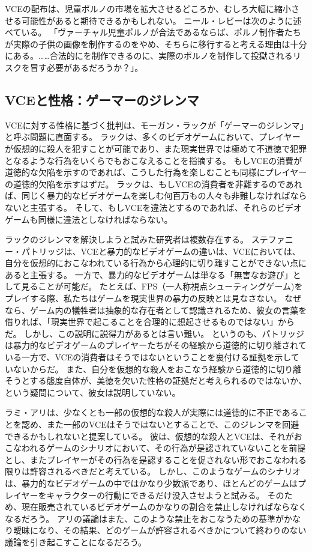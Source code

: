 \documentclass[paper=a4,book,openany]{jlreq}
\newcommand{\ig}[1]{}           %
\begin{document}
VCEの配布は、児童ポルノの市場を拡大させるどころか、むしろ大幅に縮小させる可能性があると期待できるかもしれない。
ニール・レビーは次のように述べている。
「ヴァーチャル児童ポルノが合法であるならば、ポルノ制作者たちが実際の子供の画像を制作するのをやめ、そちらに移行すると考える理由は十分にある。……合法的にを制作できるのに、実際のポルノを制作して投獄されるリスクを冒す必要があるだろうか？」\citep[p.320]{levy02:_virtual_child_pornog}\ig{Neil Levy}。

\subsection{VCEと性格：ゲーマーのジレンマ}

VCEに対する性格に基づく批判は、モーガン・ラックが「ゲーマーのジレンマ」と呼ぶ問題に直面する。
ラックは、多くのビデオゲームにおいて、プレイヤーが仮想的に殺人を犯すことが可能であり、また現実世界では極めて不道徳で犯罪となるような行為をいくらでもおこなえることを指摘する。
もしVCEの消費が道徳的な欠陥を示すのであれば、こうした行為を楽しむことも同様にプレイヤーの道徳的欠陥を示すはずだ。
ラックは、もしVCEの消費者を非難するのであれば、同じく暴力的なビデオゲームを楽しむ何百万もの人々も非難しなければならないと主張する。
そして、もしVCEを違法とするのであれば、それらのビデオゲームも同様に違法としなければならない\citep{luck09:_gamer_dilem}。

ラックのジレンマを解決しようと試みた研究者は複数存在する。
ステファニー・パトリッジは、VCEと暴力的なビデオゲームの違いは、VCEにおいては、自分を仮想的におこなわれている行為から心理的に切り離すことができない点にあると主張する。
一方で、暴力的なビデオゲームは単なる「無害なお遊び」として見ることが可能だ。
たとえば、FPS（一人称視点シューティングゲーム)をプレイする際、私たちはゲームを現実世界の暴力の反映とは見なさない。
なぜなら、ゲーム内の犠牲者は抽象的な存在者として認識されるため、彼女の言葉を借りれば、「現実世界で起こることを合理的に想起させるものではない」からだ\citep[p.33]{patridge13:_pornog_ethic_video_games}。
しかし、この説明に説得力があるとは言い難い。
というのも、パトリッジは暴力的なビデオゲームのプレイヤーたちがその経験から道徳的に切り離されている一方で、VCEの消費者はそうではないということを裏付ける証拠を示していないからだ。
また、自分を仮想的な殺人をおこなう経験から道徳的に切り離そうとする態度自体が、美徳を欠いた性格の証拠だと考えられるのではないか、という疑問について、彼女は説明していない。

ラミ・アリは、少なくとも一部の仮想的な殺人が実際には道徳的に不正であることを認め、また一部のVCEはそうではないとすることで、このジレンマを回避できるかもしれないと提案している。
彼は、仮想的な殺人とVCEは、それがおこなわれるゲームのシナリオにおいて、その行為が是認されていないことを前提とし、またプレイヤーがその行為を是認することを促されない形でおこなわれる限りは許容されるべきだと考えている\citep{ali15:_new_solut_gamer_dilem}。
しかし、このようなゲームのシナリオは、暴力的なビデオゲームの中ではかなり少数派であり、ほとんどのゲームはプレイヤーをキャラクターの行動にできるだけ没入させようと試みる。
そのため、現在販売されているビデオゲームのかなりの割合を禁止しなければならなくなるだろう。
アリの議論はまた、このような禁止をおこなうための基準がかなり曖昧になり、その結果、どのゲームが許容されるべきかについて終わりのない議論を引き起こすことになるだろう。
\end{document}
